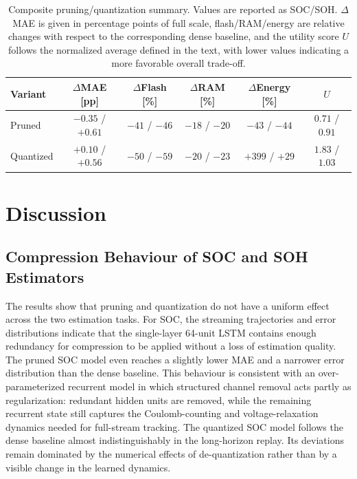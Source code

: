 \documentclass[
    a4paper,
    12pt,
    titlepage,
    bibliography=totoc,
    twoside=on,
    parskip=false,
    numbers=noenddot,
    cleardoublepage=empty,
    DIV=12,
    BCOR=12.0mm,
    headheight=36pt,
    headings=openright
]{scrreprt}
\begin{document}
\begin{table}[H]
    \centering
    \caption[Pruning and quantization summary.]{Composite pruning/quantization summary. Values are reported as SOC/SOH. $\Delta$MAE is given in percentage points of full scale, flash/RAM/energy are relative changes with respect to the corresponding dense baseline, and the utility score $U$ follows the normalized average defined in the text, with lower values indicating a more favorable overall trade-off.}
    \label{tab:embedded_tradeoff_summary}
    \begin{tabular}{@{}lccccc@{}}
        \toprule
        Variant & $\Delta$MAE [pp] & $\Delta$Flash [\%] & $\Delta$RAM [\%] & $\Delta$Energy [\%] & $U$ \\
        \midrule
        Pruned & $-0.35$ / $+0.61$ & $-41$ / $-46$ & $-18$ / $-20$ & $-43$ / $-44$ & $0.71$ / $0.91$ \\
        Quantized & $+0.10$ / $+0.56$ & $-50$ / $-59$ & $-20$ / $-23$ & $+399$ / $+29$ & $1.83$ / $1.03$ \\
        \bottomrule
    \end{tabular}
\end{table}

\section{Discussion}
\subsection{Compression Behaviour of SOC and SOH Estimators}
The results show that pruning and quantization do not have a uniform effect across the two estimation tasks. For SOC, the streaming trajectories and error distributions indicate that the single-layer 64-unit LSTM contains enough redundancy for compression to be applied without a loss of estimation quality. The pruned SOC model even reaches a slightly lower MAE and a narrower error distribution than the dense baseline. This behaviour is consistent with an over-parameterized recurrent model in which structured channel removal acts partly as regularization: redundant hidden units are removed, while the remaining recurrent state still captures the Coulomb-counting and voltage-relaxation dynamics needed for full-stream tracking. The quantized SOC model follows the dense baseline almost indistinguishably in the long-horizon replay. Its deviations remain dominated by the numerical effects of de-quantization rather than by a visible change in the learned dynamics.
\end{document}
